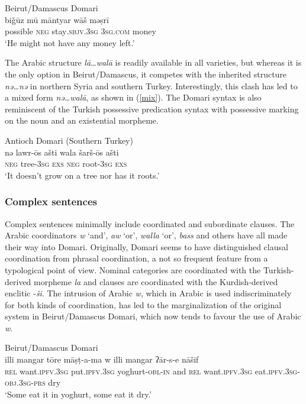 \documentclass[output=paper]{langsci/langscibook}
\begin{document}
\ea\label{ex:key:} \label{guz}
{Beirut/Damascus Domari}\\
\gll bi\v{g}ūz mū māntyar wāš məṣrī\\
     possible \textsc{neg} stay\textsc{.sbjv.3sg} \textsc{3sg.com} money\\
\glt ‘He might not have any money left.’
\z

The Arabic structure \textit{lā…walā} is readily available in all varieties, but whereas it is the only option in Beirut/Damascus, it competes with the inherited structure \textit{nə…nə} in northern Syria and southern Turkey. Interestingly, this clash has led to a mixed form \textit{nə…walā}, as shown in (\ref{mix}). The Domari syntax is also reminiscent of the Turkish possessive predication syntax with possessive marking on the noun and an existential morpheme.

\ea\label{ex:key:} \label{mix}
{Antioch Domari (Southern Turkey)}\\
\gll nə lawr-ōs ašti wala šarš-ōs ašti\\
     \textsc{neg} tree\textsc{-3sg} \textsc{exs} \textsc{neg} root\textsc{-3sg} \textsc{exs}\\
\glt ‘It doesn’t grow on a tree nor has it roots.’
\z


 \subsubsection{Complex sentences}

Complex sentences minimally include coordinated and subordinate clauses. The Arabic coordinators \textit{w} ‘and’, \textit{aw} ‘or’, \textit{walla} ‘or’, \textit{bass} and others have all made their way into Domari. Originally, Domari seems to have distinguished clausal coordination from phrasal coordination, a not so frequent feature from a typological point of view. Nominal categories are coordinated with the Turkish-derived morpheme \textit{la} and clauses are coordinated with the Kurdish-derived enclitic -\textit{ši}. The intrusion of Arabic \textit{w}, which in Arabic is used indiscriminately for both kinds of coordination, has led to the marginalization of the original system in Beirut/Damascus Domari, which now tends to favour the use of Arabic \textit{w}.

\ea
{Beirut/Damascus Domari}\\
\gll illi mangar tōre māṣṭ-a-ma w illi mangar ʔār-s-e nāšif\\
     \textsc{rel} want.\textsc{ipfv.3sg} put.\textsc{ipfv.3sg} yoghurt-\textsc{obl-in} and \textsc{rel} want.\textsc{ipfv.3sg} eat.\textsc{ipfv.3sg-obj.3sg-prs} dry\\
\glt ‘Some eat it in yoghurt, some eat it dry.’
\z
\end{document}
